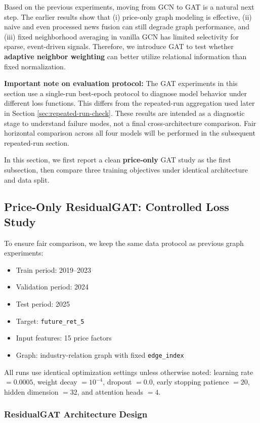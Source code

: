 Based on the previous experiments, moving from GCN to GAT is a natural next step. The earlier results show that (i) price-only graph modeling is effective, (ii) naive and even processed news fusion can still degrade graph performance, and (iii) fixed neighborhood averaging in vanilla GCN has limited selectivity for sparse, event-driven signals. Therefore, we introduce GAT to test whether \textbf{adaptive neighbor weighting} can better utilize relational information than fixed normalization.

\textbf{Important note on evaluation protocol:} The GAT experiments in this section use a single-run best-epoch protocol to diagnose model behavior under different loss functions. This differs from the repeated-run aggregation used later in Section \ref{sec:repeated-run-check}. These results are intended as a diagnostic stage to understand failure modes, not a final cross-architecture comparison. Fair horizontal comparison across all four models will be performed in the subsequent repeated-run section.

In this section, we first report a clean \textbf{price-only} GAT study as the first subsection, then compare three training objectives under identical architecture and data split.

\subsection{Price-Only ResidualGAT: Controlled Loss Study}

To ensure fair comparison, we keep the same data protocol as previous graph experiments:
\begin{itemize}
\item Train period: 2019--2023
\item Validation period: 2024
\item Test period: 2025
\item Target: \texttt{future\_ret\_5}
\item Input features: 15 price factors
\item Graph: industry-relation graph with fixed \texttt{edge\_index}
\end{itemize}

All runs use identical optimization settings unless otherwise noted: learning rate $=0.0005$, weight decay $=10^{-4}$, dropout $=0.0$, early stopping patience $=20$, hidden dimension $=32$, and attention heads $=4$.

\subsubsection{ResidualGAT Architecture Design}

